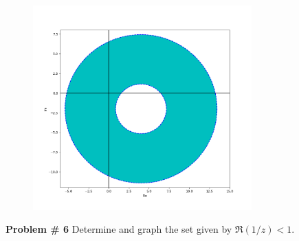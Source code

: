 \documentclass[12pt]{article}
\newcommand{\problem}[1]{\hspace{-4 ex} \large \textbf{Problem #1} }
\begin{document}
	\begin{figure}[H]
		\includegraphics[width=0.75\textwidth]{hw10_figure_1}
		\centering
	\end{figure}



\bigbreak
\problem{\# 6}Determine and graph the set given by $\Re(1/z)<1$. \bigbreak
\end{document}
